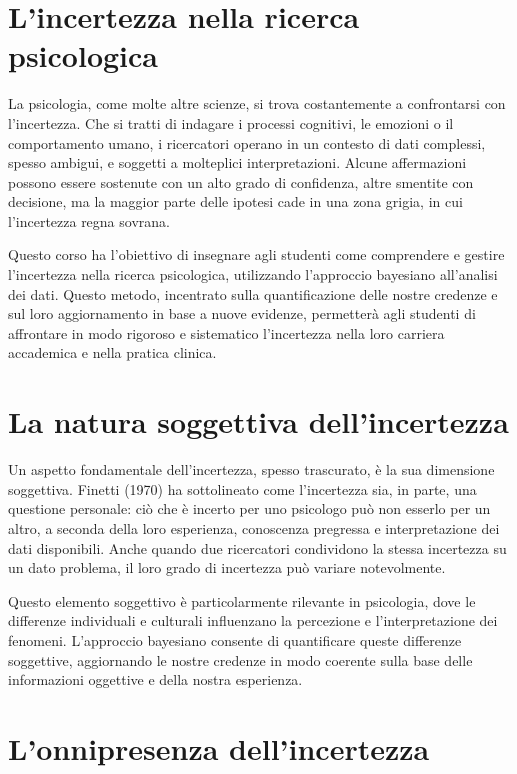 \documentclass[
  letterpaper,
  krantz2]{{[}./krantz{]}}
\begin{document}
\section{L'incertezza nella ricerca
psicologica}\label{lincertezza-nella-ricerca-psicologica}

La psicologia, come molte altre scienze, si trova costantemente a
confrontarsi con l'incertezza. Che si tratti di indagare i processi
cognitivi, le emozioni o il comportamento umano, i ricercatori operano
in un contesto di dati complessi, spesso ambigui, e soggetti a
molteplici interpretazioni. Alcune affermazioni possono essere sostenute
con un alto grado di confidenza, altre smentite con decisione, ma la
maggior parte delle ipotesi cade in una zona grigia, in cui l'incertezza
regna sovrana.

Questo corso ha l'obiettivo di insegnare agli studenti come comprendere
e gestire l'incertezza nella ricerca psicologica, utilizzando
l'approccio bayesiano all'analisi dei dati. Questo metodo, incentrato
sulla quantificazione delle nostre credenze e sul loro aggiornamento in
base a nuove evidenze, permetterà agli studenti di affrontare in modo
rigoroso e sistematico l'incertezza nella loro carriera accademica e
nella pratica clinica.

\section{La natura soggettiva
dell'incertezza}\label{la-natura-soggettiva-dellincertezza}

Un aspetto fondamentale dell'incertezza, spesso trascurato, è la sua
dimensione soggettiva. Finetti (1970) ha sottolineato come l'incertezza
sia, in parte, una questione personale: ciò che è incerto per uno
psicologo può non esserlo per un altro, a seconda della loro esperienza,
conoscenza pregressa e interpretazione dei dati disponibili. Anche
quando due ricercatori condividono la stessa incertezza su un dato
problema, il loro grado di incertezza può variare notevolmente.

Questo elemento soggettivo è particolarmente rilevante in psicologia,
dove le differenze individuali e culturali influenzano la percezione e
l'interpretazione dei fenomeni. L'approccio bayesiano consente di
quantificare queste differenze soggettive, aggiornando le nostre
credenze in modo coerente sulla base delle informazioni oggettive e
della nostra esperienza.

\section{L'onnipresenza
dell'incertezza}\label{lonnipresenza-dellincertezza}
\end{document}
